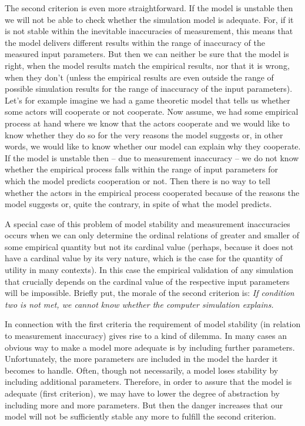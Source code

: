 The second criterion is even more straightforward. If the model is
unstable then we will not be able to check whether the simulation
model is adequate. For, if it is not stable within the inevitable
inaccuracies of measurement, this means that the model delivers
different results within the range of inaccuracy of the measured input
parameters. But then we can neither be sure that the model is right,
when the model results match the empirical results, nor that it is
wrong, when they don't (unless the empirical results are even outside
the range of possible simulation results for the range of
inaccuracy of the input parameters). Let's for example imagine we had
a game theoretic model that tells us whether some actors will
cooperate or not cooperate. Now assume, we had some empirical process
at hand where we know that the actors cooperate and we would like to
know whether they do so for the very reasons the model suggests or, in
other words, we would like to know whether our model can explain why
they cooperate.  If the model is unstable then -- due to measurement
inaccuracy -- we do not know whether the empirical process falls
within the range of input parameters for which the model predicts
cooperation or not. Then there is no way to tell whether the actors in
the empirical process cooperated because of the reasons the model
suggests or, quite the contrary, in spite of what the model predicts.

A special case of this problem of model stability and measurement
inaccuracies occurs when we can only determine the ordinal relations
of greater and smaller of some empirical quantity but not its cardinal
value (perhaps, because it does not have a cardinal value by its very
nature, which is the case for the quantity of utility in many contexts). 
In this case the empirical validation of any
simulation that crucially depends on the cardinal value of the
respective input parameters will be impossible. Briefly put, the
morale of the second criterion is: {\em If condition two is not met,
  we cannot know whether the computer simulation explains.}

In connection with the first criteria the requirement of model
stability (in relation to measurement inaccuracy) gives rise to a kind
of dilemma.  In many cases an obvious way to make a model more
adequate is by including further parameters. Unfortunately, the more
parameters are included in the model the harder it becomes to handle.
Often, though not necessarily, a model loses stability by including
additional parameters. Therefore, in order to assure that the model is
adequate (first criterion), we may have to lower the degree of
abstraction by including more and more parameters. But then the danger
increases that our model will not be sufficiently stable any more to
fulfill the second criterion.

